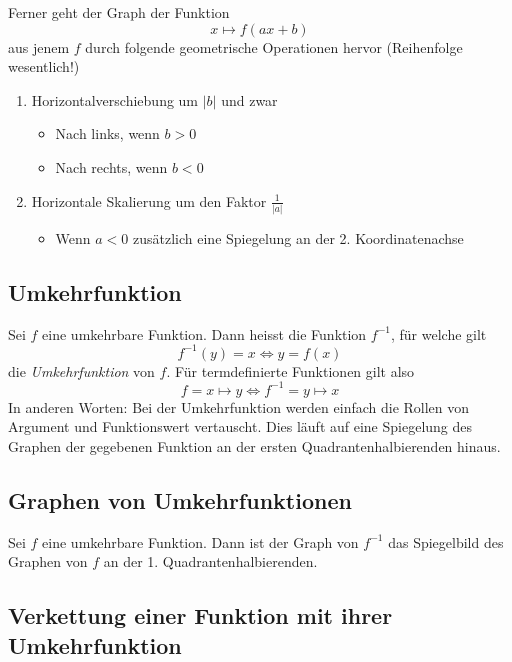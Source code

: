 Ferner geht der Graph der Funktion
%
\begin{displaymath}
	x \mapsto f(ax + b)
\end{displaymath}
%
aus jenem $f$ durch folgende geometrische Operationen hervor (Reihenfolge wesentlich!)
\begin{enumerate}
	\item Horizontalverschiebung um $|b|$ und zwar
	\begin{itemize}
		\item Nach links, wenn $b > 0$
		\item Nach rechts, wenn $b < 0$
	\end{itemize}
	\item Horizontale Skalierung um den Faktor $\displaystyle\frac{1}{|a|}$
	\begin{itemize}
		\item Wenn $a < 0$ zusätzlich eine Spiegelung an der 2. Koordinatenachse	
	\end{itemize}
\end{enumerate}


\subsection{Umkehrfunktion}

Sei $f$ eine umkehrbare Funktion. Dann heisst die Funktion $f^{-1}$, für welche gilt
%
\begin{displaymath}
	f^{-1}(y) = x \Leftrightarrow y = f(x)
\end{displaymath}
%
die \textit{Umkehrfunktion} von $f$. Für termdefinierte Funktionen gilt also
%
\begin{displaymath}
	f = x \mapsto y \Leftrightarrow f^{-1} = y \mapsto x
\end{displaymath}
%
In anderen Worten: Bei der Umkehrfunktion werden einfach die Rollen von Argument und Funktionswert
vertauscht. Dies läuft auf eine Spiegelung des Graphen der gegebenen Funktion an der ersten
Quadrantenhalbierenden hinaus.


\subsection{Graphen von Umkehrfunktionen}

Sei $f$ eine umkehrbare Funktion. Dann ist der Graph von $f^{-1}$ das Spiegelbild des Graphen von
$f$ an der 1. Quadrantenhalbierenden.


\subsection{Verkettung einer Funktion mit ihrer Umkehrfunktion}

